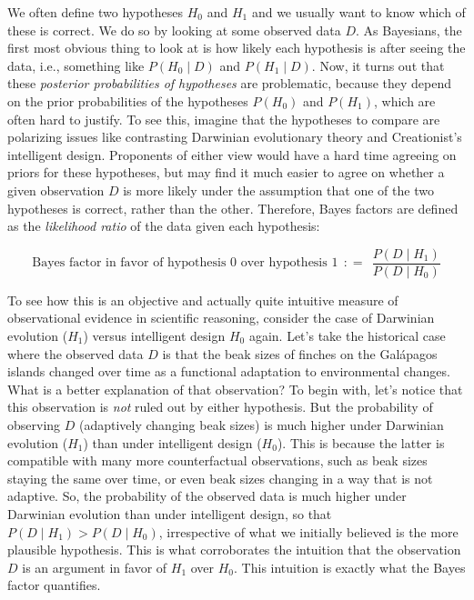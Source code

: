 \documentclass[
  doc,
  floatsintext,
  longtable,
  nolmodern,
  notxfonts,
  notimes,
  colorlinks=true,linkcolor=blue,citecolor=blue,urlcolor=blue]{apa7}
\begin{document}
We often define two hypotheses \(H_0\) and \(H_1\) and we usually want
to know which of these is correct. We do so by looking at some observed
data \(D\). As Bayesians, the first most obvious thing to look at is how
likely each hypothesis is after seeing the data, i.e., something like
\(P(H_0 \mid D)\) and \(P(H_1 \mid D)\). Now, it turns out that these
\emph{posterior probabilities of hypotheses} are problematic, because
they depend on the prior probabilities of the hypotheses \(P(H_0)\) and
\(P(H_1)\), which are often hard to justify. To see this, imagine that
the hypotheses to compare are polarizing issues like contrasting
Darwinian evolutionary theory and Creationist's intelligent design.
Proponents of either view would have a hard time agreeing on priors for
these hypotheses, but may find it much easier to agree on whether a
given observation \(D\) is more likely under the assumption that one of
the two hypotheses is correct, rather than the other. Therefore, Bayes
factors are defined as the \emph{likelihood ratio} of the data given
each hypothesis:

\[
\text{Bayes factor in favor of hypothesis 0 over hypothesis 1} \ \  \colon\!= \ \ \frac{P(D \mid H_1)}{P(D \mid H_0)}
\]

To see how this is an objective and actually quite intuitive measure of
observational evidence in scientific reasoning, consider the case of
Darwinian evolution (\(H_1\)) versus intelligent design \(H_0\) again.
Let's take the historical case where the observed data \(D\) is that the
beak sizes of finches on the Galápagos islands changed over time as a
functional adaptation to environmental changes. What is a better
explanation of that observation? To begin with, let's notice that this
observation is \emph{not} ruled out by either hypothesis. But the
probability of observing \(D\) (adaptively changing beak sizes) is much
higher under Darwinian evolution (\(H_1\)) than under intelligent design
(\(H_0\)). This is because the latter is compatible with many more
counterfactual observations, such as beak sizes staying the same over
time, or even beak sizes changing in a way that is not adaptive. So, the
probability of the observed data is much higher under Darwinian
evolution than under intelligent design, so that
\(P(D \mid H_1) > P(D \mid H_0)\), irrespective of what we initially
believed is the more plausible hypothesis. This is what corroborates the
intuition that the observation \(D\) is an argument in favor of \(H_1\)
over \(H_0\). This intuition is exactly what the Bayes factor
quantifies.
\end{document}
